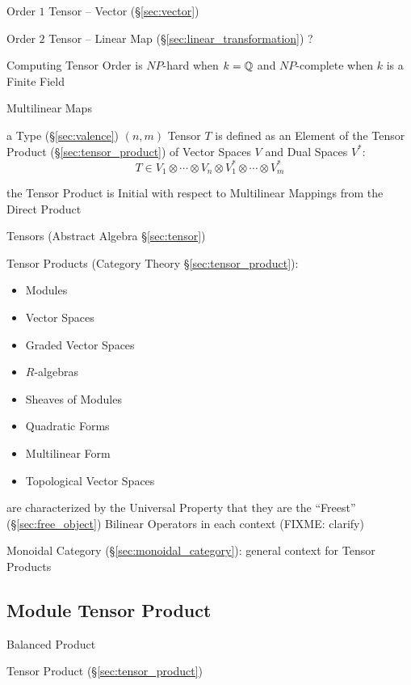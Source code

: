 Order $1$ Tensor -- Vector (\S\ref{sec:vector})

Order $2$ Tensor -- Linear Map (\S\ref{sec:linear_transformation}) ?

Computing Tensor Order is $NP$-hard when $k = \mathbb{Q}$ and $NP$-complete
when $k$ is a Finite Field %


\asterism


Multilinear Maps


\asterism


a Type (\S\ref{sec:valence}) $(n,m)$ Tensor $T$ is defined as an
Element of the Tensor Product (\S\ref{sec:tensor_product}) of Vector
Spaces $V$ and Dual Spaces $V^*$:
\[
  T \in V_1 \otimes \cdots \otimes V_n
    \otimes V^*_1 \otimes \cdots \otimes V^*_m
\]

the Tensor Product is Initial with respect to Multilinear Mappings
from the Direct Product

Tensors (Abstract Algebra \S\ref{sec:tensor})

Tensor Products (Category Theory \S\ref{sec:tensor_product}):
\begin{itemize}
  \item Modules
  \item Vector Spaces
  \item Graded Vector Spaces
  \item $R$-algebras
  \item Sheaves of Modules
  \item Quadratic Forms
  \item Multilinear Form
  \item Topological Vector Spaces
\end{itemize}
are characterized by the Universal Property that they are the ``Freest''
(\S\ref{sec:free_object}) Bilinear Operators in each context
(FIXME: clarify)

Monoidal Category (\S\ref{sec:monoidal_category}): general context for
Tensor Products



\subsection{Module Tensor Product}\label{sec:module_tensor_product}

Balanced Product

\fist Tensor Product (\S\ref{sec:tensor_product})



